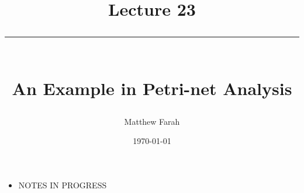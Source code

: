\documentclass{article}
\date{
	\vspace{-.75em}
	{\large \today}
}
\title{
	\vspace*{-1.5em}
	{\Huge Lecture 23} \\
	\vspace{-1em}
	\rule{\textwidth/4}{.01em} \\
	\vspace{-.25em}
	{\Large An Example in Petri-net Analysis}
	\vspace{-.75em}
}
\author{
	{\large Matthew Farah}
}
\begin{document}
\maketitle
\pagestyle{fancy}

\fi

\begin{itemize}
	\item NOTES IN PROGRESS
\end{itemize}

\ifdefined\iscombined
	\newpage
\else
	
\end{document}
